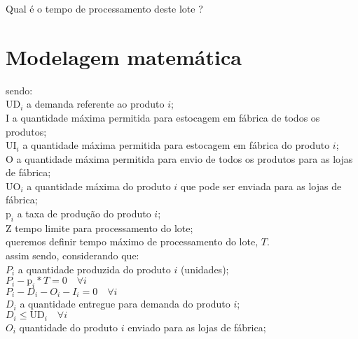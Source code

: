 \documentclass{book}
\begin{document}
Qual é o tempo de processamento deste lote ? \\

\section{Modelagem matemática}

sendo: \\

$\textrm{UD}_i$ a demanda referente ao produto $i$; \\

$\textrm{I}$ a quantidade máxima permitida para estocagem em fábrica de todos os produtos; \\

$\textrm{UI}_i$ a quantidade máxima permitida para estocagem em fábrica do produto $i$; \\

$\textrm{O}$ a quantidade máxima permitida para envio de todos os produtos para as lojas de fábrica; \\

$\textrm{UO}_i$ a quantidade máxima do produto $i$ que pode ser enviada para as lojas de fábrica; \\ 

$\textrm{p}_i$ a taxa de produção do produto $i$; \\

$\textrm{Z}$ tempo limite para processamento do lote; \\

queremos definir tempo máximo de processamento do lote, $T$. \\

assim sendo, considerando que: \\

$P_i$ a quantidade produzida do produto $i$ (unidades); \\

$P_i - \textrm{p}_i * T  = 0 \quad \forall i$ \\

$P_i - D_i - O_i - I_i = 0 \quad \forall i$ \\

$D_i$ a quantidade entregue para demanda do produto $i$; \\

$D_i \leq \textrm{UD}_i \quad \forall i$ \\

$O_i$ quantidade do produto $i$ enviado para as lojas de fábrica; \\
\end{document}

